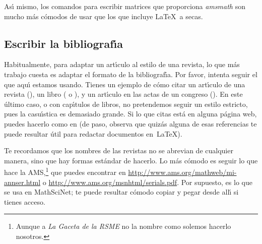 \documentclass[autocontact]{gaceta}
\begin{document}
As\'{\i} mismo, los comandos para escribir matrices que proporciona \textit{amsmath} son mucho m\'as c\'omodos de usar que los que incluye \LaTeX\ a secas.

\subsection{Escribir la bibliograf\'{\i}a}

Habitualmente, para adaptar un art\'{\i}culo al estilo de una revista, lo que m\'as trabajo cuesta es adaptar el formato de la bibliograf\'{\i}a. 
Por favor, intenta seguir el que aqu\'{\i} estamos usando. Tienes un ejemplo de c\'omo citar un art\'{\i}culo de una revista (\cite{Kn}), un libro (\cite{latex-imprenta} o \cite{latex-companion}), y un art\'{\i}culo en las actas de un congreso (\cite{Tao-ICM}). En este \'ultimo caso, o con cap\'{\i}tulos de libros, no pretendemos seguir un estilo estricto, pues la casu\'{\i}stica es demasiado grande. Si lo que citas est\'a en alguna p\'agina web, puedes hacerlo como en \cite{Be-spanish, Be-orto, Do, MeSl} (de paso, observa que quiz\'as alguna de esas referencias te puede resultar \'util para redactar documentos en~\LaTeX).


Te recordamos que los nombres de las revistas no se abrevian de cualquier manera, sino que hay formas est\'andar de hacerlo. Lo m\'as c\'omodo es seguir lo que hace la AMS,\footnote{Aunque a \textit{La Gaceta de la RSME} no la nombre como solemos hacerlo nosotros.} que puedes encontrar en \url{http://www.ams.org/mathweb/mi-annser.html}
o \url{http://www.ams.org/msnhtml/serials.pdf}. Por supuesto, es lo que se usa en MathSciNet; te puede resultar c\'omodo copiar y pegar desde all\'{\i} si tienes acceso.
\end{document}
